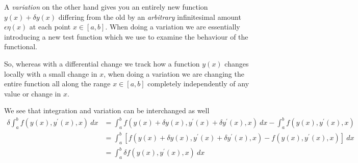 \documentclass[a4paper]{article}
\begin{document}
    A \textit{variation} on the other hand gives you an entirely new function \(y(x) + \delta y(x)\) differing from the old by an \textit{arbitrary} infinitesimal amount \(\epsilon \eta(x)\) at each point \(x \in [a, b]\). When doing a variation we are essentially introducing a new test function which we use to examine the behaviour of the functional.
    
    So, whereas with a differential change we track how a function \(y(x)\) changes locally with a small change in \(x\), when doing a variation we are changing the entire function all along the range \(x \in [a, b]\) completely independently of any value or change in \(x\).  
    
    We see that integration and variation can be interchanged as well
    \begin{align*}
        \delta \int_a^b f(y(x), y^{\prime} (x), x)\ dx &= \int_a ^b f(y(x) + \delta y(x), y^{\prime} (x) + \delta y^{\prime} (x), x) \ dx - \int_a ^b f(y(x), y^{\prime} (x), x)\\
        &= \int_a ^b \left[ f(y(x) + \delta y(x), y^{\prime} (x) + \delta y^{\prime} (x), x) - f(y(x), y^{\prime} (x), x)\right]\ dx\\
        &= \int _a ^b \delta f(y(x), y^{\prime} (x), x)\ dx
    \end{align*}
\end{document}
